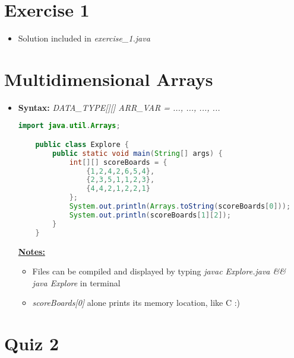 \documentclass[12pt]{article}
\begin{document}
\bigskip

\section{Exercise 1}

\bigskip

\begin{itemize}
    \item Solution included in \textit{exercise\_1.java}
\end{itemize}

\bigskip

\section{Multidimensional Arrays}

\bigskip

\begin{itemize}
    \item \textbf{Syntax:} \textit{DATA\_TYPE[][] ARR\_VAR = { {...}, {...}, ..., {...} }}

    \begin{lstlisting}[language=Java, caption={lesson\_05/Explore.java}]
    import java.util.Arrays;

    public class Explore {
        public static void main(String[] args) {
            int[][] scoreBoards = {
                {1,2,4,2,6,5,4},
                {2,3,5,1,1,2,3},
                {4,4,2,1,2,2,1}
            };
            System.out.println(Arrays.toString(scoreBoards[0]));
            System.out.println(scoreBoards[1][2]);
        }
    }
    \end{lstlisting}


    \underline{\textbf{Notes:}}

    \bigskip

    \begin{itemize}
        \item Files can be compiled and displayed by typing \textit{javac Explore.java \&\& java Explore}
        in terminal
        \item \textit{scoreBoards[0]} alone prints its memory location, like C :)
    \end{itemize}
\end{itemize}

\bigskip

\section{Quiz 2}
\end{document}
